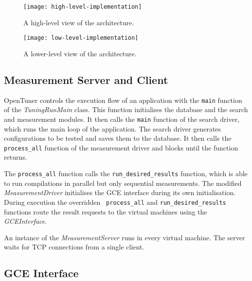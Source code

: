 \begin{figure}[htpb]
    \centering
    \begin{minipage}{.45\textwidth}
        \centering
        \texttt{[image: high-level-implementation]}
        \caption{A high-level view of the architecture.}
        \label{fig:high-level}
    \end{minipage}%
    \hfill
    \begin{minipage}{.45\textwidth}
        \centering
        \texttt{[image: low-level-implementation]}
        \caption{A lower-level view of the architecture.}
        \label{fig:low-level}
    \end{minipage}%
    \label{fig:archs}
\end{figure}

\subsection{Measurement Server and Client}
\label{sec:server-client}

OpenTuner controls the execution flow of an application with the
\texttt{\footnotesize main} function of the \emph{TuningRunMain} class. This
function initialises the database and the search and measurement modules. It
then calls the \texttt{\footnotesize main} function of the search driver, which
runs the main loop of the application.  The search driver generates
configurations to be tested and saves them to the database. It then calls the
\texttt{\footnotesize process\_all} function of the measurement driver and
blocks until the function returns.

The \texttt{\footnotesize process\_all} function calls the
\texttt{\footnotesize run\_desired\_results} function, which is able to run
compilations in parallel but only sequential measurements.  The modified
\emph{MeasurementDriver} initialises the GCE interface during its own
initialisation. During execution the overridden \texttt{\footnotesize
process\_all} and \texttt{\footnotesize run\_desired\_results} functions route
the result requests to the virtual machines using the \emph{GCEInterface}.

An instance of the \emph{MeasurementServer} runs in every virtual machine. The
server waits for TCP connections from a single client.

\subsection{GCE Interface}
\label{sec:gce}

